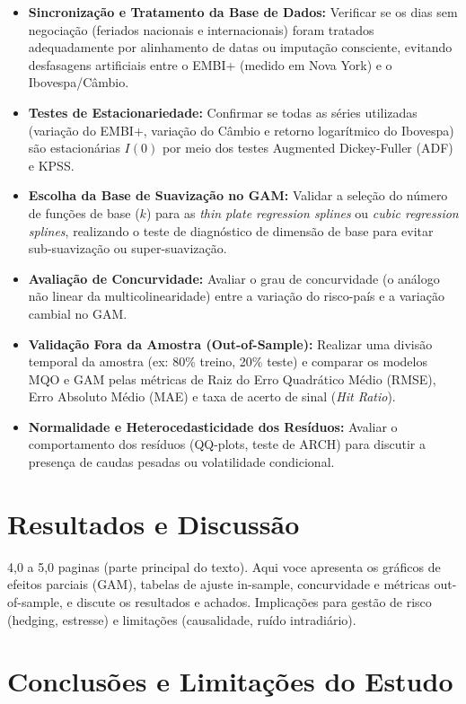 \documentclass[11pt,a4paper]{article}
\begin{document}
\begin{itemize}
    \item [\square] \textbf{Sincronização e Tratamento da Base de Dados:} Verificar se os dias sem negociação (feriados nacionais e internacionais) foram tratados adequadamente por alinhamento de datas ou imputação consciente, evitando desfasagens artificiais entre o EMBI+ (medido em Nova York) e o Ibovespa/Câmbio.
    \item [\square] \textbf{Testes de Estacionariedade:} Confirmar se todas as séries utilizadas (variação do EMBI+, variação do Câmbio e retorno logarítmico do Ibovespa) são estacionárias $I(0)$ por meio dos testes Augmented Dickey-Fuller (ADF) e KPSS.
    \item [\square] \textbf{Escolha da Base de Suavização no GAM:} Validar a seleção do número de funções de base ($k$) para as \textit{thin plate regression splines} ou \textit{cubic regression splines}, realizando o teste de diagnóstico de dimensão de base para evitar sub-suavização ou super-suavização.
    \item [\square] \textbf{Avaliação de Concurvidade:} Avaliar o grau de concurvidade (o análogo não linear da multicolinearidade) entre a variação do risco-país e a variação cambial no GAM.
    \item [\square] \textbf{Validação Fora da Amostra (Out-of-Sample):} Realizar uma divisão temporal da amostra (ex: 80\% treino, 20\% teste) e comparar os modelos MQO e GAM pelas métricas de Raiz do Erro Quadrático Médio (RMSE), Erro Absoluto Médio (MAE) e taxa de acerto de sinal (\textit{Hit Ratio}).
    \item [\square] \textbf{Normalidade e Heterocedasticidade dos Resíduos:} Avaliar o comportamento dos resíduos (QQ-plots, teste de ARCH) para discutir a presença de caudas pesadas ou volatilidade condicional.
\end{itemize}

\section{Resultados e Discussão}


4,0 a 5,0 paginas (parte principal do texto). Aqui voce apresenta os gráficos de efeitos parciais (GAM), tabelas de ajuste in-sample, concurvidade e métricas out-of-sample, e discute os resultados e achados. Implicações para gestão de risco (hedging, estresse) e limitações (causalidade, ruído intradiário).

\section{Conclusões e Limitações do Estudo}
\end{document}
